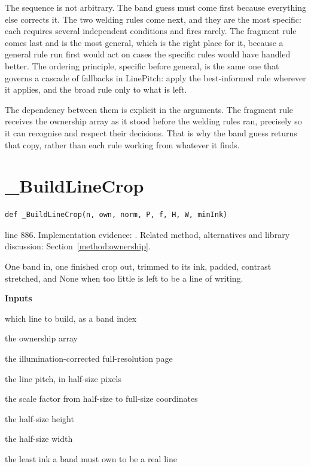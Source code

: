 The sequence is not arbitrary. The band guess must come first because everything else corrects it. The two welding rules come next, and they are the most specific: each requires several independent conditions and fires rarely. The fragment rule comes last and is the most general, which is the right place for it, because a general rule run first would act on cases the specific rules would have handled better. The ordering principle, specific before general, is the same one that governs a cascade of fallbacks in LinePitch: apply the best-informed rule wherever it applies, and the broad rule only to what is left.

The dependency between them is explicit in the arguments. The fragment rule receives the ownership array as it stood before the welding rules ran, precisely so it can recognise and respect their decisions. That is why the band guess returns that copy, rather than each rule working from whatever it finds.



\section{\_BuildLineCrop}\label{fn:segment:-BuildLineCrop}
\begin{lstlisting}[style=sig]
def _BuildLineCrop(n, own, norm, P, f, H, W, minInk)
\end{lstlisting}
 line 886. Implementation evidence: \cite{code2026}. Related method, alternatives and library discussion: Section~\ref{method:ownership}.


One band in, one finished crop out, trimmed to its ink, padded, contrast stretched, and None when too little is left to be a line of writing.




\noindent\textbf{Inputs}
\begin{description}[leftmargin=2.2em,style=nextline,font=\normalfont\ttfamily]\setlength\itemsep{1pt}
  \item[{n}] \normalfont which line to build, as a band index
  \item[{own}] \normalfont the ownership array
  \item[{norm}] \normalfont the illumination-corrected full-resolution page
  \item[{P}] \normalfont the line pitch, in half-size pixels
  \item[{f}] \normalfont the scale factor from half-size to full-size coordinates
  \item[{H}] \normalfont the half-size height
  \item[{W}] \normalfont the half-size width
  \item[{minInk}] \normalfont the least ink a band must own to be a real line
\end{description}

